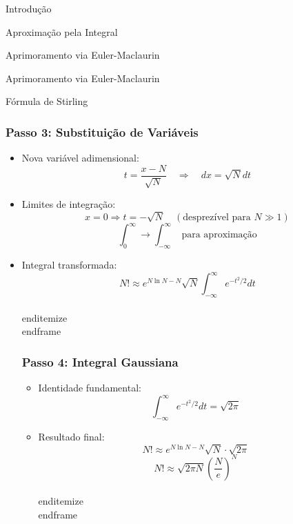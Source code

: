 \documentclass[11pt]{beamer}
\begin{document}
\begin{frame}
\begin{frame}
\begin{itemize}
\begin{frame}{Introdução}
\begin{itemize}
\begin{frame}{Aproximação pela Integral}
\begin{itemize}
\begin{frame}{Aprimoramento via Euler-Maclaurin}
\begin{itemize}
\begin{frame}{Aprimoramento via Euler-Maclaurin}
\begin{itemize}
\begin{frame}{Fórmula de Stirling}
\begin{itemize}
\begin{frame}
\begin{itemize}
\begin{frame}
\begin{itemize}
\begin{frame}
\begin{frame}
\begin{itemize}
\begin{frame}
\begin{itemize}
\begin{frame}
\frametitle{Passo 3: Substituição de Variáveis}
\begin{itemize}
\item Nova variável adimensional:
\[ t = \frac{x - N}{\sqrt{N}} \quad \Rightarrow \quad dx = \sqrt{N} dt \]
\item Limites de integração:
\[ x = 0 \Rightarrow t = -\sqrt{N} \quad (\text{desprezível para } N \gg 1) \]
\[ \int_0^\infty \to \int_{-\infty}^\infty \text{ para aproximação} \]
\item Integral transformada:
\[
N! \approx e^{N \ln N - N} \sqrt{N} \int_{-\infty}^\infty e^{-t^2/2} dt
\]
\\end{itemize}
\\end{frame}

\begin{frame}
\frametitle{Passo 4: Integral Gaussiana}
\begin{itemize}
\item Identidade fundamental:
\[ \int_{-\infty}^\infty e^{-t^2/2} dt = \sqrt{2\pi} \]
\item Resultado final:
\[
N! \approx e^{N \ln N - N} \sqrt{N} \cdot \sqrt{2\pi}
\]
\[
N! \approx \sqrt{2\pi N} \left( \frac{N}{e} \right)^N
\]
\\end{itemize}
\\end{frame}


\end{itemize}
\end{frame}
\end{itemize}
\end{frame}
\end{itemize}
\end{frame}
\end{itemize}
\end{frame}
\end{frame}
\end{itemize}
\end{frame}
\end{itemize}
\end{frame}
\end{itemize}
\end{frame}
\end{itemize}
\end{frame}
\end{itemize}
\end{frame}
\end{itemize}
\end{frame}
\end{itemize}
\end{frame}
\end{itemize}
\end{frame}
\end{frame}
\end{document}
